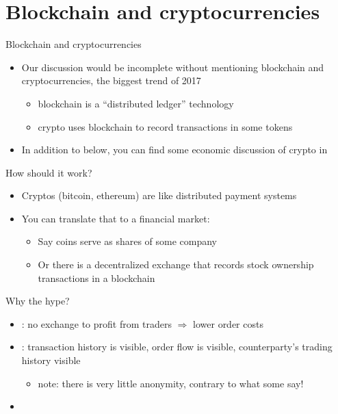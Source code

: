 \documentclass[english,10pt
,aspectratio=169
]{beamer}
\begin{document}
\section{Blockchain and cryptocurrencies}

\begin{frame}{Blockchain and cryptocurrencies}
	\begin{itemize}
		\item Our discussion would be incomplete without mentioning \alert{blockchain} and \alert{cryptocurrencies}, the biggest trend of 2017
		\begin{itemize}
			\item blockchain is a ``distributed ledger'' technology
			\item crypto uses blockchain to record transactions in some tokens
		\end{itemize}
		\item In addition to below, you can find some economic discussion of crypto in \citet*{nica_cryptocurrencies_2017}
	\end{itemize}
\end{frame}


\begin{frame}{How should it work?}
	\begin{itemize}
		\item Cryptos (bitcoin, ethereum) are like distributed payment systems
		\item You can translate that to a financial market:
		\begin{itemize}
			\item Say coins serve as shares of some company
			\item Or there is a decentralized exchange that records stock ownership transactions in a blockchain
		\end{itemize}
	\end{itemize}
\end{frame}


\begin{frame}{Why the hype?}
	\begin{itemize}
		\item {}: no exchange to profit from traders $\Rightarrow$ lower order costs
		\item {}: transaction history is visible, order flow is visible, counterparty's trading history visible
		\begin{itemize}
			\item note: there is very little anonymity, contrary to what some say!
		\end{itemize}
		\item {}
	\end{itemize}
\end{frame}
\end{document}
